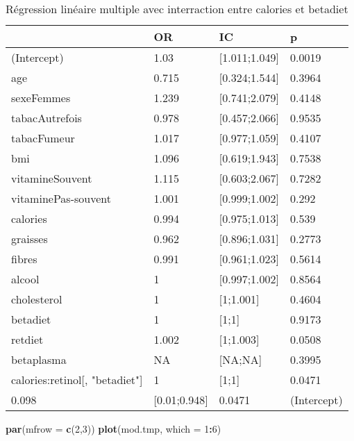 \documentclass[]{article}
\newenvironment{Shaded}{\begin{snugshade}}{\end{snugshade}}
\newcommand{\KeywordTok}[1]{\textcolor[rgb]{0.13,0.29,0.53}{\textbf{#1}}}
\newcommand{\DataTypeTok}[1]{\textcolor[rgb]{0.13,0.29,0.53}{#1}}
\newcommand{\DecValTok}[1]{\textcolor[rgb]{0.00,0.00,0.81}{#1}}
\newcommand{\OperatorTok}[1]{\textcolor[rgb]{0.81,0.36,0.00}{\textbf{#1}}}
\newcommand{\NormalTok}[1]{#1}
\begin{document}
\begin{table}

\caption{\label{tab:unnamed-chunk-88}Régression linéaire multiple avec interraction entre calories et betadiet}
\centering
\begin{tabular}[t]{l|l|l|l}
\hline
  & OR & IC & p\\
\hline
\rowcolor[HTML]{BBD2E1}  (Intercept) & 1.03 & [1.011;1.049] & 0.0019\\
\hline
age & 0.715 & [0.324;1.544] & 0.3964\\
\hline
\rowcolor[HTML]{BBD2E1}  sexeFemmes & 1.239 & [0.741;2.079] & 0.4148\\
\hline
tabacAutrefois & 0.978 & [0.457;2.066] & 0.9535\\
\hline
\rowcolor[HTML]{BBD2E1}  tabacFumeur & 1.017 & [0.977;1.059] & 0.4107\\
\hline
bmi & 1.096 & [0.619;1.943] & 0.7538\\
\hline
\rowcolor[HTML]{BBD2E1}  vitamineSouvent & 1.115 & [0.603;2.067] & 0.7282\\
\hline
vitaminePas-souvent & 1.001 & [0.999;1.002] & 0.292\\
\hline
\rowcolor[HTML]{BBD2E1}  calories & 0.994 & [0.975;1.013] & 0.539\\
\hline
graisses & 0.962 & [0.896;1.031] & 0.2773\\
\hline
\rowcolor[HTML]{BBD2E1}  fibres & 0.991 & [0.961;1.023] & 0.5614\\
\hline
alcool & 1 & [0.997;1.002] & 0.8564\\
\hline
\rowcolor[HTML]{BBD2E1}  cholesterol & 1 & [1;1.001] & 0.4604\\
\hline
betadiet & 1 & [1;1] & 0.9173\\
\hline
\rowcolor[HTML]{BBD2E1}  retdiet & 1.002 & [1;1.003] & 0.0508\\
\hline
betaplasma & NA & [NA;NA] & 0.3995\\
\hline
\rowcolor[HTML]{BBD2E1}  calories:retinol[, "betadiet"] & 1 & [1;1] & 0.0471\\
\hline
0.098 & [0.01;0.948] & 0.0471 & (Intercept)\\
\hline
\end{tabular}
\end{table}

\begin{Shaded}
\begin{Highlighting}[]
\KeywordTok{par}\NormalTok{(}\DataTypeTok{mfrow =} \KeywordTok{c}\NormalTok{(}\DecValTok{2}\NormalTok{,}\DecValTok{3}\NormalTok{))}
\KeywordTok{plot}\NormalTok{(mod.tmp, }\DataTypeTok{which =} \DecValTok{1}\OperatorTok{:}\DecValTok{6}\NormalTok{)}
\end{Highlighting}
\end{Shaded}
\end{document}
